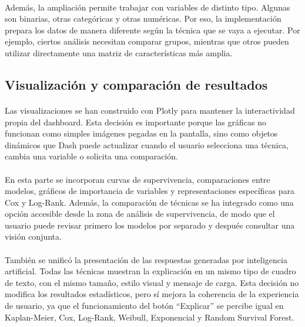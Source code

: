\paragraph*{}
Además, la ampliación permite trabajar con variables de distinto tipo. Algunas son binarias, otras categóricas y otras numéricas. Por eso, la implementación prepara los datos de manera diferente según la técnica que se vaya a ejecutar. Por ejemplo, ciertos análisis necesitan comparar grupos, mientras que otros pueden utilizar directamente una matriz de características más amplia.

\subsection{Visualización y comparación de resultados}

\paragraph*{}
Las visualizaciones se han construido con Plotly para mantener la interactividad propia del dashboard. Esta decisión es importante porque las gráficas no funcionan como simples imágenes pegadas en la pantalla, sino como objetos dinámicos que Dash puede actualizar cuando el usuario selecciona una técnica, cambia una variable o solicita una comparación.

\paragraph*{}
En esta parte se incorporan curvas de supervivencia, comparaciones entre modelos, gráficos de importancia de variables y representaciones específicas para Cox y Log-Rank. Además, la comparación de técnicas se ha integrado como una opción accesible desde la zona de análisis de supervivencia, de modo que el usuario puede revisar primero los modelos por separado y después consultar una visión conjunta.

\paragraph*{}
También se unificó la presentación de las respuestas generadas por inteligencia artificial. Todas las técnicas muestran la explicación en un mismo tipo de cuadro de texto, con el mismo tamaño, estilo visual y mensaje de carga. Esta decisión no modifica los resultados estadísticos, pero sí mejora la coherencia de la experiencia de usuario, ya que el funcionamiento del botón ``Explicar'' se percibe igual en Kaplan-Meier, Cox, Log-Rank, Weibull, Exponencial y Random Survival Forest.

